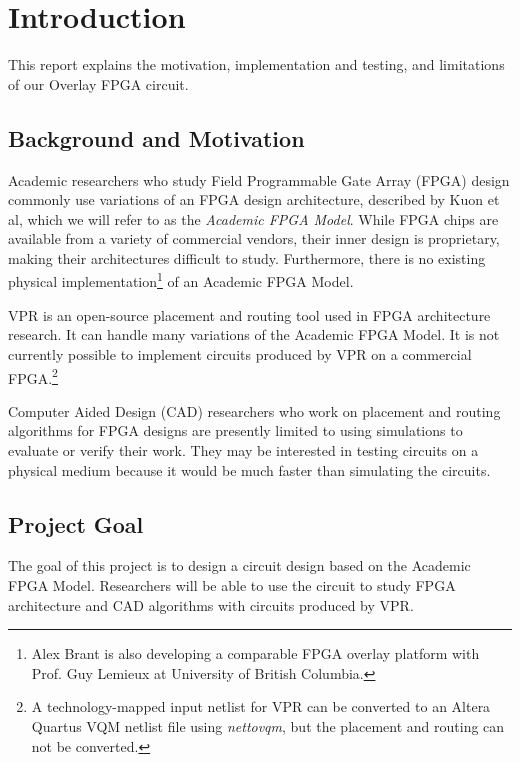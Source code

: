 \section{Introduction}

This report explains the motivation, implementation and testing, and limitations of our Overlay FPGA circuit.


\subsection{Background and Motivation}

Academic researchers who study Field Programmable Gate Array (FPGA) design commonly use variations of an FPGA design architecture, described by Kuon et al\cite{fpga}, which we will refer to as the \emph{Academic FPGA Model}.
While FPGA chips are available from a variety of commercial vendors, their inner design is proprietary, making their architectures difficult to study.
Furthermore, there is no existing physical implementation\footnote{Alex Brant is also developing a comparable FPGA overlay platform with Prof. Guy Lemieux at University of British Columbia.} of an Academic FPGA Model.

VPR\cite{vpr} is an open-source placement and routing tool used in FPGA architecture research.
It can handle many variations of the Academic FPGA Model.
It is not currently possible to implement circuits produced by VPR on a commercial FPGA.\footnote{A technology-mapped input netlist for VPR can be converted to an Altera Quartus VQM netlist file using \emph{nettovqm}\cite{nettovqm}, but the placement and routing can not be converted.}

Computer Aided Design (CAD) researchers who work on placement and routing algorithms for FPGA designs are presently limited to using simulations to evaluate or verify their work.
They may be interested in testing circuits on a physical medium because it would be much faster than simulating the circuits.



\subsection{Project Goal}

The goal of this project is to design a circuit design based on the Academic FPGA Model.
Researchers will be able to use the circuit to study FPGA architecture and CAD algorithms with circuits produced by VPR.



